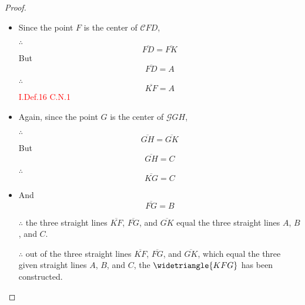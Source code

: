 \documentclass{book}
\begin{document}
\begin{proof}

\begin{itemize}

\item[]

\item Since the point $F$ is the center of $\mathscr{C}{FD}$, 

\item[$\therefore$] 
\[\overline{FD} = \overline{FK}\] 
But 
\[\overline{FD} = A\] 

\item[$\therefore$] 
\[\overline{KF} = A\] \hfill\textcolor{red}{I.Def.16 C.N.1}

\item Again, since the point $G$ is the center of $\mathscr{G}{GH}$,

\item[$\therefore$] 
\[\overline{GH} = \overline{GK}\]
 But 
\[\overline{GH} = C\] 

\clearpage
 
 \item[$\therefore$] 
 \[\overline{KG} = C\]

\item And 
\[\overline{FG} = B\]

\item[$\therefore$] the three straight lines $\overline{KF}$, $\overline{FG}$, and $\overline{GK}$ equal the three straight lines $A$, $B$, and $C$.

\item[$\therefore$] out of the three straight lines $\overline{KF}$, $\overline{FG}$, and $\overline{GK}$, which equal the three given straight lines $A$, $B$, and $C$, the $\widetriangle{KFG}$ has been constructed.

\end{itemize}

\end{proof}

\clearpage

\clearpage
\end{document}
